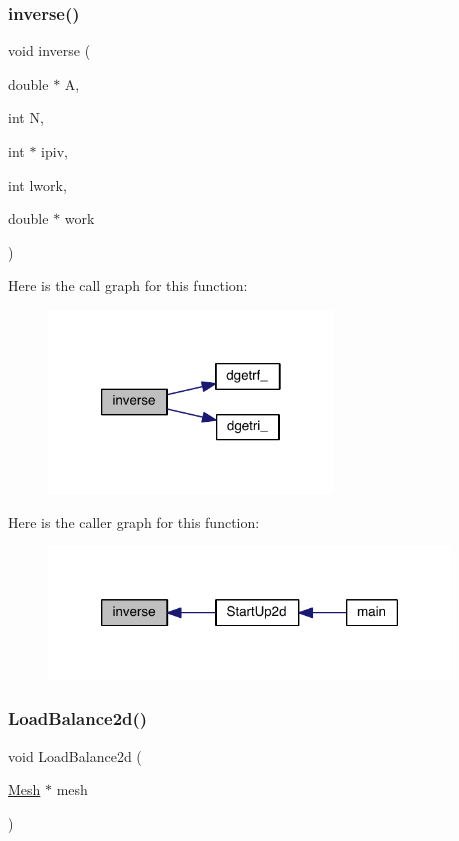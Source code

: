 \subsubsection{\texorpdfstring{inverse()}{inverse()}}
{\footnotesize\ttfamily void inverse (\begin{DoxyParamCaption}\item[{double $\ast$}]{A,  }\item[{int}]{N,  }\item[{int $\ast$}]{ipiv,  }\item[{int}]{lwork,  }\item[{double $\ast$}]{work }\end{DoxyParamCaption})}

Here is the call graph for this function\+:\nopagebreak
\begin{figure}[H]
\begin{center}
\leavevmode
\includegraphics[width=214pt]{a00554_ad2387c52fae7bf66e1511ef9a281ee26_cgraph}
\end{center}
\end{figure}
Here is the caller graph for this function\+:\nopagebreak
\begin{figure}[H]
\begin{center}
\leavevmode
\includegraphics[width=302pt]{a00554_ad2387c52fae7bf66e1511ef9a281ee26_icgraph}
\end{center}
\end{figure}
\mbox{\label{a00554_a251e55e80af031383ec1f7ec753439de}} 
\subsubsection{\texorpdfstring{Load\+Balance2d()}{LoadBalance2d()}}
{\footnotesize\ttfamily void Load\+Balance2d (\begin{DoxyParamCaption}\item[{\hyperlink{a00557_aeffbe0891ab73a4d8964c9cb7978426e}{Mesh} $\ast$}]{mesh }\end{DoxyParamCaption})}

